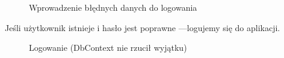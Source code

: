 \begin{flushleft}
\begin{figure}[H]
\begin{center}
        \caption{Wprowadzenie błędnych danych do logowania}
        \label{fig:okn_log}
	\end{center}
    \end{figure}
    \hspace{5mm}Jeśli użytkownik istnieje i hasło jest poprawne —logujemy się do aplikacji.
    \begin{figure}[H]
    \centering
    \caption{Logowanie (DbContext nie rzucił wyjątku)}
    \label{fig:popr_log}
    \end{figure}

\end{flushleft}
